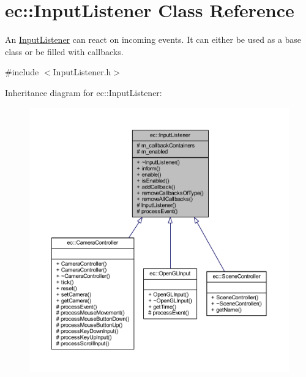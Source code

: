 \hypertarget{classec_1_1_input_listener}{}\section{ec\+:\+:Input\+Listener Class Reference}
\label{classec_1_1_input_listener}


An \mbox{\hyperlink{classec_1_1_input_listener}{Input\+Listener}} can react on incoming events. It can either be used as a base class or be filled with callbacks.  




{\ttfamily \#include $<$Input\+Listener.\+h$>$}



Inheritance diagram for ec\+:\+:Input\+Listener\+:\nopagebreak
\begin{figure}[H]
\begin{center}
\leavevmode
\includegraphics[width=350pt]{classec_1_1_input_listener__inherit__graph}
\end{center}
\end{figure}


